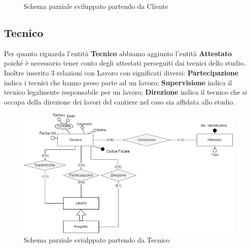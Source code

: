 \documentclass{elegantbook}
\begin{document}
            \begin{figure}[H]
                \caption{Schema parziale sviluppato partendo da Cliente}
            \end{figure}

            \subsection{Tecnico}
            Per quanto riguarda l'entità \textbf{Tecnico} abbiamo aggiunto l'entità \textbf{Attestato} poiché è necessario tener conto degli attestati perseguiti dai tecnici dello studio. Inoltre inserito 3 relazioni con Lavoro con significati diversi:
            \textbf{Partecipazione} indica i tecnici che hanno preso parte ad un lavoro;
            \textbf{Supervisione} indica il tecnico legalmente responsabile per un lavoro;
            \textbf{Direzione} indica il tecnico che si occupa della direzione dei lavori del cantiere nel caso sia affidata allo studio.
            
            \begin{figure}[H]
            	\includegraphics[scale=0.7]{../Img/DBSchemes/tecnico-completo.png} 
                \caption{Schema parziale sviulppato partendo da Tecnico}
            \end{figure}
            
\end{document}
